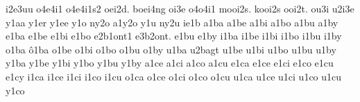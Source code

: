{i2e3uu
%
%
o4e4i1
o4e4i1s2
oei2d.
boei4ng
oi3e
o4o4i1
mooi2s.
kooi2s
ooi2t.
ou3i
%
u2i3e
%
%
y1aa
y1er
y1ee
y1o
ny2o
a1y2o
y1u
ny2u
%
%
%
%
ie1b
%
a1ba
a1be
a1bi
a1bo
a1bu
a1by
%
e1ba
e1be
e1bi
e1bo
e2b1ont1
e3b2ont.
e1bu
e1by
%
%
i1ba
i1be
i1bi
i1bo
i1bu
i1by
%
o1ba
ô1ba
o1be
o1bi
o1bo
o1bu
o1by
%
u1ba
u2bagt
u1be
u1bi
u1bo
u1bu
u1by
%
y1ba
y1be
y1bi
y1bo
y1bu
y1by
%
%
a1ce
a1ci
a1co
a1cu
%
e1ca
e1ce
e1ci
e1co
e1cu
e1cy
%
i1ca
i1ce
i1ci
i1co
i1cu
%
o1ca
o1ce
o1ci
o1co
o1cu
%
u1ca
u1ce
u1ci
u1co
u1cu
%
y1co
}
